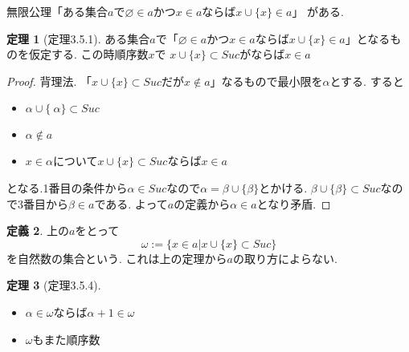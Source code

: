 \documentclass[dvipdfmx,a4paper,11pt]{article}
\theoremstyle{definition}
\newtheorem{thm}{定理}
\newtheorem{dfn}[thm]{定義}
\begin{document}
無限公理「ある集合$a$で$\varnothing \in a$かつ$x \in a$ならば$x \cup \{ x\} \in a$」
がある.

 \begin{tcolorbox}
 [colback = white, colframe = green!35!black, fonttitle = \bfseries,breakable = true]
\begin{thm}[定理3.5.1]
ある集合$a$で「$\varnothing \in a$かつ$x \in a$ならば$x \cup \{ x\} \in a$」となるものを仮定する.
この時順序数$x$で
$x \cup \{ x\} \subset Suc$がならば$x \in a$
\end{thm}
\end{tcolorbox}

\begin{proof}
背理法. 「$x \cup \{ x\} \subset Suc$だが$x \not \in a$」なるもので最小限を$\alpha$とする.
すると
\begin{itemize}
\item $\alpha \cup \{\ \alpha\} \subset Suc$
\item $\alpha \not \in a$
\item $x \in \alpha$について$x \cup \{ x\} \subset Suc$ならば$x \in a$
\end{itemize}
となる.1番目の条件から$\alpha \in Suc$なので$\alpha = \beta \cup \{ \beta\}$とかける.
$\beta \cup \{ \beta\} \subset Suc$なので3番目から$\beta \in a$である.
よって$a$の定義から$\alpha \in a$となり矛盾.
\end{proof}

 \begin{tcolorbox}
 [colback = white, colframe = green!35!black, fonttitle = \bfseries,breakable = true]
\begin{dfn}
上の$a$をとって
$$
\omega:= \{x  \in a| x \cup \{ x\} \subset Suc\}
$$
を自然数の集合という.
これは上の定理から$a$の取り方によらない. 
\end{dfn}
\end{tcolorbox}

 \begin{tcolorbox}
 [colback = white, colframe = green!35!black, fonttitle = \bfseries,breakable = true]
\begin{thm}[定理3.5.4]
\begin{itemize}
\item $\alpha \in \omega$ならば$\alpha + 1 \in \omega$
\item $\omega$もまた順序数
\end{itemize}
\end{thm}
\end{tcolorbox}
\end{document}
